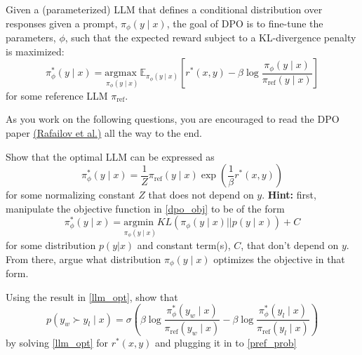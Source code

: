 \documentclass[11pt,addpoints,answers]{exam}
\begin{document}
\begin{questions}
\begin{parts}
Given a (parameterized) LLM that defines a conditional distribution over responses given a prompt, $\pi_{\phi}(y \mid x)$, the goal of DPO is to fine-tune the parameters, $\phi$, such that the expected reward subject to a KL-divergence penalty is maximized:
\begin{equation}
    \pi_{\phi}^*(y \mid x) = \underset{\pi_{\phi}(y \mid x)}{\textrm{argmax }} \mathbb{E}_{\pi_{\phi}(y \mid x)}\left[r^*(x,y) - \beta \log \frac{\pi_{\phi}(y \mid x)}{\pi_{\textrm{ref}}(y \mid x)}\right]
    \label{dpo_obj}
\end{equation}
for some reference LLM $\pi_{\textrm{ref}}$. 


As you work on the following questions, you are encouraged to read the DPO paper \href{https://arxiv.org/pdf/2305.18290}{(Rafailov
et al.)} all the way to the end.

\begin{subparts}

\clearpage
    \subpart[5] Show that the optimal LLM can be expressed as 
    \begin{equation}
        \pi_{\phi}^*(y \mid x) = \frac{1}{Z}\pi_{\textrm{ref}}(y \mid x)\exp \left(\frac{1}{\beta}r^*(x,y)\right)
        \label{llm_opt}
    \end{equation} 
    for some normalizing constant $Z$ that does not depend on $y$. \textbf{Hint:} first, manipulate the objective function in \eqref{dpo_obj} to be of the form  
    \begin{equation}
        \pi_{\phi}^*(y \mid x) = \underset{\pi_{\phi}(y \mid x)}{\textrm{argmin }} KL\left(\pi_{\phi}(y \mid x) || p(y \mid x)\right) + C
    \end{equation} 
    for some distribution $p (y | x)$ and constant term(s), $C$, that don't depend on $y$. From there, argue what distribution $\pi_{\phi}(y \mid x)$ optimizes the objective in that form. 
    
    \begin{answer_box}[title=,height=12cm, width=14.5cm]
    \end{answer_box}

\clearpage
    \subpart[3] Using the result in \eqref{llm_opt}, show that
    \begin{equation}
        p\left(y_w \succ y_l \mid x \right) = \sigma\left(\beta \log \frac{\pi_{\phi}^*(y_w \mid x)}{\pi_{\textrm{ref}}(y_w \mid x)} - \beta \log \frac{\pi_{\phi}^*(y_l \mid x)}{\pi_{\textrm{ref}}(y_l \mid x)} \right)
        \label{pref_llm}
    \end{equation}
    by solving \eqref{llm_opt} for $r^*(x,y)$ and plugging it in to 
    \eqref{pref_prob}
    

\end{subparts}
\end{parts}
\end{questions}
\end{document}
